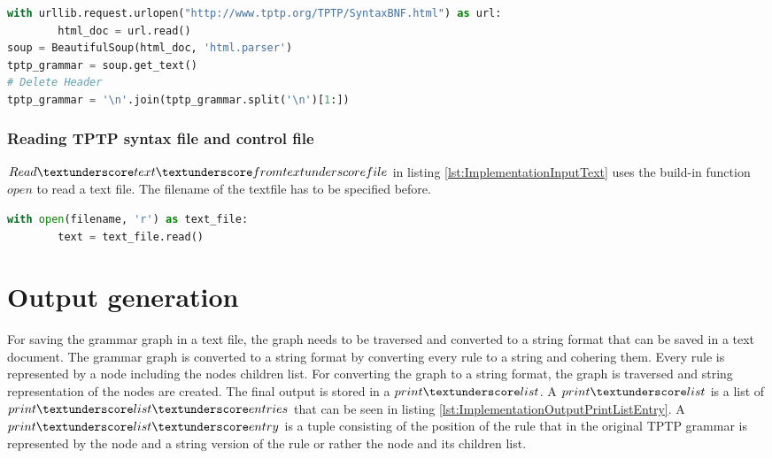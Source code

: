 \begin{lstlisting}[language=Python, basicstyle=\scriptsize	, caption= Import TPTP syntax from the \ac{TPTP} website, label= lst:ImplementationInputWeb]
with urllib.request.urlopen("http://www.tptp.org/TPTP/SyntaxBNF.html") as url:
        html_doc = url.read()
soup = BeautifulSoup(html_doc, 'html.parser')
tptp_grammar = soup.get_text()
# Delete Header
tptp_grammar = '\n'.join(tptp_grammar.split('\n')[1:])
\end{lstlisting}

\subsubsection{Reading \ac{TPTP} syntax file and control file}

$Read\textunderscore text\textunderscore fromtextunderscore file$ in listing \ref{lst:ImplementationInputText} uses the build-in function $open$ to read a text file. The filename of the textfile has to be specified before.\\

\begin{lstlisting}[language=Python, basicstyle=\scriptsize	,caption= Read text from file,label= lst:ImplementationInputText]
with open(filename, 'r') as text_file:
        text = text_file.read()
\end{lstlisting}

\section{Output generation}\label{sec:ImplementationOutputGeneration}
For saving the grammar graph in a text file, the graph needs to be traversed and converted to a string format that can be saved in a text document. The grammar graph is converted to a string format by converting every rule to a string and cohering them. Every rule is represented by a node including the nodes children list. For converting the graph to a string format, the graph is traversed and string representation of the nodes are created.
The final output is stored in a $print\textunderscore list$. A $print\textunderscore list$ is a list of $print\textunderscore list\textunderscore entries$ that can be seen in listing \ref{lst:ImplementationOutputPrintListEntry}. A $print\textunderscore list\textunderscore entry$ is a tuple consisting of the position of the rule that in the original \ac{TPTP} grammar is represented by the node and a string version of the rule or rather the node and its children list.


